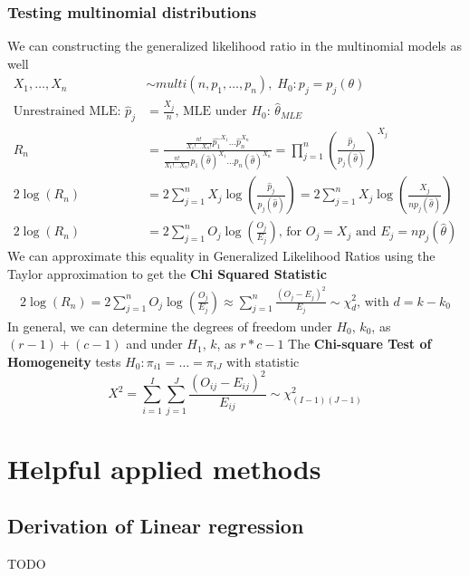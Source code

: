 \documentclass{article}
\begin{document}
\subsubsection{Testing multinomial distributions}
We can constructing the generalized likelihood ratio in the multinomial models as well
\begin{align*}
    X_1, \dots, X_n &\sim multi(n, p_1, \dots, p_n), \; H_0: p_j = p_j(\theta)
    \\
    \textrm{Unrestrained MLE: } \hat{p}_j &= \frac{X_j}{n} \textrm{, MLE under $H_0$: } \hat{\theta}_{MLE}\\
    R_n &= \frac{\frac{n!}{X_1!\dots X_n!}\hat{p_1}^{X_1}\dots\hat{p}_n^{X_n}}{\frac{n!}{X_1!\dots X_n!}p_1(\hat{\theta})^{X_1} \dots p_n(\hat{\theta})^{X_n}} = \prod_{j=1}^n \left(\frac{\hat{p}_j}{p_j(\hat{\theta})} \right)^{X_j}\\
    2\log(R_n) &= 2 \sum_{j=1}^n X_j\log\left(\frac{\hat{p}_j}{p_j(\hat{\theta})} \right) = 2 \sum_{j=1}^n X_j\log\left(\frac{X_j}{np_j(\hat{\theta})}\right)\\
    2\log(R_n) &= 2\sum_{j=1}^nO_j\log\left(\frac{O_j}{E_j}\right) \textrm{, for } O_j=X_j \textrm{ and } E_j = np_j(\hat{\theta})
\end{align*}
We can approximate this equality in Generalized Likelihood Ratios using the Taylor approximation to get the \textbf{Chi Squared Statistic}
\begin{align*}
    2\log(R_n) = 2\sum_{j=1}^nO_j\log\left(\frac{O_j}{E_j}\right) \approx \sum_{j=1}^n \frac{(O_j-E_j)^2}{E_j} \sim \chi^2_d \textrm{, with } d = k - k_0
\end{align*}
In general, we can determine the degrees of freedom under $H_0$, $k_0$, as $(r-1) + (c-1)$ and under $H_1$, $k$, as $r*c-1$
The \textbf{Chi-square Test of Homogeneity} tests $H_0: \pi_{i1} = \dots = \pi_{iJ}$ with statistic
\begin{equation*}
    X^2 = \sum_{i=1}^I \sum_{j=1}^J \frac{(O_{ij} - E_{ij})^2}{E_{ij}} \sim \chi^2_{(I-1)(J-1)}
\end{equation*}

\section{Helpful applied methods}
\subsection{Derivation of Linear regression}
TODO
\end{document}
